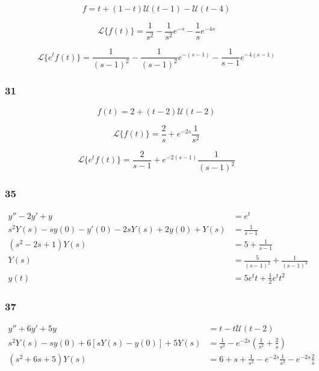 \documentclass{article}
\begin{document}
\[f = t + (1 - t) \mathcal{U}(t - 1) - \mathcal{U}(t - 4)\]

\[\mathcal{L}\{f(t)\} = \frac{1}{s^2} - \frac{1}{s^2} e^{-s} - \frac{1}{s} e^{-4 s}\]

\[\mathcal{L}\{e^t f(t)\} = \frac{1}{(s - 1)^2} - \frac{1}{(s - 1)^2} e^{-(s - 1)} - \frac{1}{s - 1} e^{-4 (s - 1)}\]

\subsubsection{31}

\[f(t) = 2 + (t - 2) \mathcal{U}(t - 2)\]

\[\mathcal{L}\{f(t)\} = \frac{2}{s} + e^{-2 s} \frac{1}{s^2}\]

\[\mathcal{L}\{e^t f(t)\} = \frac{2}{s - 1} + e^{-2 (s - 1)} \frac{1}{(s - 1)^2}\]

\subsubsection{35}

\begin{align*}
  y'' - 2 y' + y                                       & = e^t                                       \\
  s^2 Y(s) - s y(0) - y'(0) - 2 s Y(s) + 2 y(0) + Y(s) & = \frac{1}{s - 1}                           \\
  (s^2 - 2 s + 1) Y(s)                                 & = 5 + \frac{1}{s - 1}                       \\
  Y(s)                                                 & = \frac{5}{(s - 1)^2} + \frac{1}{(s - 1)^3} \\
  y(t)                                                 & = 5 e^t t + \frac{1}{2} e^t t^2
\end{align*}

\subsubsection{37}

\begin{align*}
  y'' + 6 y' + 5 y                               & = t - t \mathcal{U}(t - 2)                                              \\
  s^2 Y(s) - s y(0) + 6 [s Y(s) - y(0)] + 5 Y(s) & = \frac{1}{s^2} - e^{-2 s} \left( \frac{1}{s^2} + \frac{2}{s} \right)   \\
  (s^2 + 6 s + 5) Y(s)                           & = 6 + s + \frac{1}{s^2} - e^{-2 s} \frac{1}{s^2} - e^{-2 s} \frac{2}{s}
\end{align*}
\end{document}
